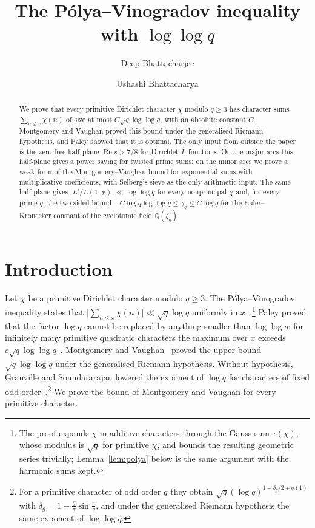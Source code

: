 \documentclass{aomart}
\title[P\'olya--Vinogradov with $\log\log q$]{The P\'olya--Vinogradov inequality with $\log\log q$}
\author[D. Bhattacharjee]{Deep Bhattacharjee}
\author[U. Bhattacharya]{Ushashi Bhattacharya}
\numberwithin{equation}{section}
\theoremstyle{definition}
\renewcommand{\Re}{\operatorname{Re}}
\begin{document}
\begin{abstract}
We prove that every primitive Dirichlet character $\chi$ modulo $q\ge3$ has character sums
$\sum_{n\le x}\chi(n)$ of size at most $C\sqrt q\log\log q$, with an absolute constant $C$.
Montgomery and Vaughan proved this bound under the generalised Riemann hypothesis, and Paley
showed that it is optimal. The only input from outside the paper is the zero-free half-plane
$\Re s>7/8$ for Dirichlet $L$-functions. On the major arcs this half-plane gives a power saving for
twisted prime sums; on the minor arcs we prove a weak form of the Montgomery--Vaughan bound for
exponential sums with multiplicative coefficients, with Selberg's sieve as the only arithmetic
input. The same half-plane gives $|L'/L(1,\chi)|\ll\log\log q$ for every nonprincipal $\chi$
and, for every prime $q$, the two-sided bound
$-C\log q\log\log q\le\gamma_q\le C\log q$ for the Euler--Kronecker constant of the cyclotomic
field $\mathbb Q(\zeta_q)$.
\end{abstract}

\maketitle

\section{Introduction}

Let $\chi$ be a primitive Dirichlet character modulo $q\ge3$. The P\'olya--Vinogradov inequality
states that $\bigl|\sum_{n\le x}\chi(n)\bigr|\ll\sqrt q\log q$ uniformly in
$x$~\cite[Chapter~23]{Dav00}.\footnote{The proof expands $\chi$ in additive characters through the
Gauss sum $\tau(\bar\chi)$, whose modulus is $\sqrt q$ for primitive $\chi$, and bounds the
resulting geometric series trivially; Lemma~\ref{lem:polya} below is the same argument with the
harmonic sums kept.} Paley proved that the factor $\log q$ cannot be replaced by anything smaller
than $\log\log q$: for infinitely many primitive quadratic characters the maximum over $x$ exceeds
$c\sqrt q\log\log q$~\cite{Pal32}. Montgomery and Vaughan~\cite{MV77} proved the upper bound
$\sqrt q\log\log q$ under the generalised Riemann hypothesis. Without hypothesis, Granville and
Soundararajan lowered the exponent of $\log q$ for characters of fixed odd
order~\cite{GS07}.\footnote{For a primitive character of odd order $g$ they obtain
$\sqrt q(\log q)^{1-\delta_g/2+o(1)}$ with $\delta_g=1-\frac g\pi\sin\frac\pi g$, and under the
generalised Riemann hypothesis the same exponent of $\log\log q$.} We prove the bound of Montgomery and Vaughan for every primitive character.
\end{document}
